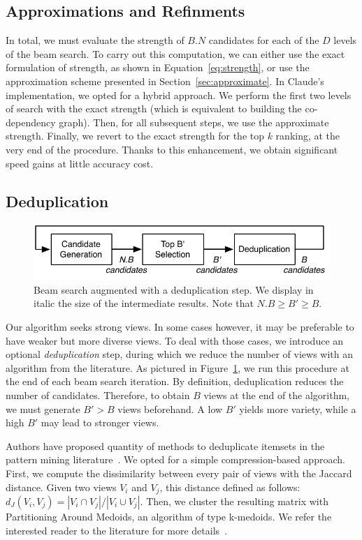 \subsection{Approximations and Refinments}
In total, we must evaluate the strength of $B.N$ candidates for each of the $D$
levels of the beam search. To carry out this computation,  we can either use
the exact formulation of strength, as shown in Equation~\ref{eq:strength}, or
use the approximation scheme presented in Section~\ref{sec:approximate}. In
Claude's implementation, we opted for a hybrid approach. We perform the first
two levels of search with the exact strength (which is equivalent to building
the co-dependency graph).  Then, for all subsequent steps, we use the
approximate strength. Finally, we revert to the exact strength for the top $k$
ranking, at the very end of the procedure. Thanks to this enhancement, we
obtain significant speed gains at little accuracy cost.

\subsection{Deduplication}
\label{sec:variety}

\begin{figure}[t!]
\centering
\includegraphics[width=\columnwidth]{images/deduplication}
\caption{Beam search augmented with a deduplication step. We display in italic
the size of the intermediate results. Note that $N.B \geq B' \geq B$.}
\label{pic:deduplication}
\end{figure}
Our algorithm seeks strong views. In some cases however, it may be preferable
to have weaker but more diverse views. To deal with those cases, we introduce
an optional \emph{deduplication} step, during which we reduce the number of
views with an algorithm from the literature. As pictured in
Figure~\ref{pic:deduplication}, we run this procedure at the end of each
beam search iteration.  By definition, deduplication reduces the number
of candidates. Therefore, to obtain $B$ views at the end of the algorithm, we
must generate $B' > B$ views beforehand. A low $B'$ yields more variety,
while a high $B'$ may lead to stronger views.

Authors have proposed quantity of methods to deduplicate itemsets in the
pattern mining literature~\cite{xin2005mining, van2006compression}. We opted
for a simple compression-based approach. First, we compute the dissimilarity
between every pair of views with the Jaccard distance. Given two views $V_i$
and $V_j$, this distance defined as follows: $d_J(V_i, V_j) = |V_i \cap V_j | /
| V_i \cup V_j |$. Then, we cluster the resulting matrix with Partitioning
Around Medoids, an algorithm of type k-medoids.  We refer the interested reader
to the literature for more details~\cite{kaufman2009finding}.






